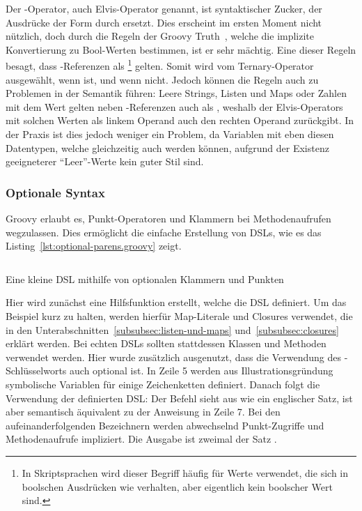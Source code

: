 \documentclass[a4paper]{article}
\newcommand{\codelisting}[3]{
\begin{listing}[ht]
	\inputminted{#1}{#1/#2}
	\caption{#3}
	\label{lst:#2}
\end{listing}
}
\begin{document}
Der -Operator, auch Elvis-Operator genannt, ist syntaktischer Zucker, der Ausdrücke der Form  durch  ersetzt.
Dies erscheint im ersten Moment nicht nützlich, doch durch die Regeln der Groovy Truth~\cite[Abs.~5.]{groovy-lang:semantics}, welche die implizite Konvertierung zu Bool-Werten bestimmen, ist er sehr mächtig.
Eine dieser Regeln besagt, dass -Referenzen als \footnote{In Skriptsprachen wird dieser Begriff häufig für Werte verwendet, die sich in boolschen Ausdrücken wie  verhalten, aber eigentlich kein boolscher Wert sind.} gelten.
Somit wird  vom Ternary-Operator ausgewählt, wenn   ist, und  wenn nicht.
Jedoch können die Regeln auch zu Problemen in der Semantik führen:
Leere Strings, Listen und Maps oder Zahlen mit dem Wert  gelten neben -Referenzen auch als , weshalb der Elvis-Operators mit solchen Werten als linkem Operand auch den rechten Operand zurückgibt.
In der Praxis ist dies jedoch weniger ein Problem, da Variablen mit eben diesen Datentypen, welche gleichzeitig auch  werden können, aufgrund der Existenz geeigneterer ``Leer''-Werte kein guter Stil sind.

\subsubsection{Optionale Syntax}\label{subsubsec:optionale-syntax}

Groovy erlaubt es, Punkt-Operatoren und Klammern bei Methodenaufrufen wegzulassen.
Dies ermöglicht die einfache Erstellung von DSLs, wie es das Listing~\ref{lst:optional-parens.groovy} zeigt.

\codelisting{groovy}{optional-parens.groovy}{Eine kleine DSL mithilfe von optionalen Klammern und Punkten}

Hier wird zunächst eine Hilfsfunktion  erstellt, welche die DSL definiert.
Um das Beispiel kurz zu halten, werden hierfür Map-Literale und Closures verwendet, die in den Unterabschnitten~\ref{subsubsec:listen-und-maps} und~\ref{subsubsec:closures} erklärt werden.
Bei echten DSLs sollten stattdessen Klassen und Methoden verwendet werden.
Hier wurde zusätzlich ausgenutzt, dass die Verwendung des -Schlüsselworts auch optional ist.
In Zeile 5 werden aus Illustrationsgründung symbolische Variablen für einige Zeichenketten definiert.
Danach folgt die Verwendung der definierten DSL:
Der Befehl sieht aus wie ein englischer Satz, ist aber semantisch äquivalent zu der Anweisung in Zeile 7.
Bei den aufeinanderfolgenden Bezeichnern werden abwechselnd Punkt-Zugriffe und Methodenaufrufe impliziert.
Die Ausgabe ist zweimal der Satz .
\end{document}
